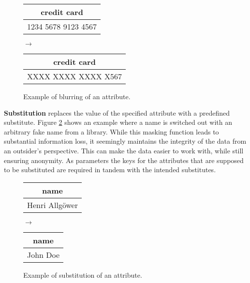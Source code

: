 \begin{figure}[ht]
    \begin{center}
    \footnotesize{
        \renewcommand{\arraystretch}{1.5}
        \begin{tabular}{|c|}
            \hline
            credit card \\
            \hline
            1234 5678 9123 4567 \\
            \hline
            \end{tabular}
            \quad $\longrightarrow$ \quad
            \begin{tabular}{|c|}
            \hline
            credit card \\
            \hline
            XXXX XXXX XXXX X567 \\
            \hline
        \end{tabular}
    }
    \end{center}
    \caption{Example of blurring of an attribute.\label{fig:blurring}}
\end{figure}

\textbf{Substitution} replaces the value of the specified attribute with a predefined substitute. Figure \ref{fig:substitution} shows an example where a name is switched out with an arbitrary fake name from a library. While this masking function leads to substantial information loss, it seemingly maintains the integrity of the data from an outsider's perspective. This can make the data easier to work with, while still ensuring anonymity. As parameters the keys for the attributes that are supposed to be substituted are required in tandem with the intended substitutes. 

\bigskip

\begin{figure}[ht]
    \begin{center}
    \footnotesize{
        \renewcommand{\arraystretch}{1.5}
        \begin{tabular}{|c|}
            \hline
            name \\
            \hline
            Henri Allgöwer \\
            \hline
            \end{tabular}
            \quad $\longrightarrow$ \quad
            \begin{tabular}{|c|}
            \hline
            name \\
            \hline
            John Doe \\
            \hline
        \end{tabular}
    }
    \end{center}
    \caption{Example of substitution of an attribute.\label{fig:substitution}}
\end{figure}

